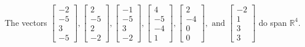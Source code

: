 \begin{exercise}
\begin{exerciseStatement}
  \end{exerciseStatement}
  \begin{exerciseAnswer}
   The vectors \(\left[\begin{array}{r}
-2 \\
-5 \\
3 \\
-5
\end{array}\right] , \left[\begin{array}{r}
2 \\
-5 \\
2 \\
-2
\end{array}\right] , \left[\begin{array}{r}
-1 \\
-5 \\
3 \\
-2
\end{array}\right] , \left[\begin{array}{r}
4 \\
-5 \\
-4 \\
1
\end{array}\right] , \left[\begin{array}{r}
2 \\
-4 \\
0 \\
0
\end{array}\right] , \text{ and } \left[\begin{array}{r}
-2 \\
1 \\
3 \\
3
\end{array}\right]\) 
  	 do  
	span \(\mathbb{R}^4\).
  


  \end{exerciseAnswer}
\end{exercise}